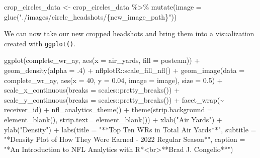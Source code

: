 \documentclass[
  letterpaper,
]{krantz}
\newenvironment{Shaded}{\begin{snugshade}}{\end{snugshade}}
\newcommand{\AttributeTok}[1]{\textcolor[rgb]{0.40,0.45,0.13}{#1}}
\newcommand{\DecValTok}[1]{\textcolor[rgb]{0.68,0.00,0.00}{#1}}
\newcommand{\FloatTok}[1]{\textcolor[rgb]{0.68,0.00,0.00}{#1}}
\newcommand{\FunctionTok}[1]{\textcolor[rgb]{0.28,0.35,0.67}{#1}}
\newcommand{\NormalTok}[1]{\textcolor[rgb]{0.00,0.23,0.31}{#1}}
\newcommand{\OtherTok}[1]{\textcolor[rgb]{0.00,0.23,0.31}{#1}}
\newcommand{\SpecialCharTok}[1]{\textcolor[rgb]{0.37,0.37,0.37}{#1}}
\newcommand{\StringTok}[1]{\textcolor[rgb]{0.13,0.47,0.30}{#1}}
\begin{document}
\begin{Shaded}
\begin{Highlighting}[]
\NormalTok{crop\_circles\_data }\OtherTok{\textless{}{-}}\NormalTok{ crop\_circles\_data }\SpecialCharTok{\%\textgreater{}\%}
  \FunctionTok{mutate}\NormalTok{(}\AttributeTok{image =} \FunctionTok{glue}\NormalTok{(}\StringTok{"./images/circle\_headshots/\{new\_image\_path\}"}\NormalTok{))}
\end{Highlighting}
\end{Shaded}

We can now take our new cropped headshots and bring them into a
visualization created with \texttt{ggplot()}.

\begin{Shaded}
\begin{Highlighting}[]
\FunctionTok{ggplot}\NormalTok{(complete\_wr\_ay, }\FunctionTok{aes}\NormalTok{(}\AttributeTok{x =}\NormalTok{ air\_yards, }\AttributeTok{fill =}\NormalTok{ posteam)) }\SpecialCharTok{+}
  \FunctionTok{geom\_density}\NormalTok{(}\AttributeTok{alpha =}\NormalTok{ .}\DecValTok{4}\NormalTok{) }\SpecialCharTok{+}
\NormalTok{  nflplotR}\SpecialCharTok{::}\FunctionTok{scale\_fill\_nfl}\NormalTok{() }\SpecialCharTok{+}
  \FunctionTok{geom\_image}\NormalTok{(}\AttributeTok{data =}\NormalTok{ complete\_wr\_ay, }\FunctionTok{aes}\NormalTok{(}\AttributeTok{x =} \DecValTok{40}\NormalTok{, }\AttributeTok{y =} \FloatTok{0.04}\NormalTok{,}
                                        \AttributeTok{image =}\NormalTok{ image),}
             \AttributeTok{size =} \FloatTok{0.5}\NormalTok{) }\SpecialCharTok{+}
  \FunctionTok{scale\_x\_continuous}\NormalTok{(}\AttributeTok{breaks =}\NormalTok{ scales}\SpecialCharTok{::}\FunctionTok{pretty\_breaks}\NormalTok{()) }\SpecialCharTok{+}
  \FunctionTok{scale\_y\_continuous}\NormalTok{(}\AttributeTok{breaks =}\NormalTok{ scales}\SpecialCharTok{::}\FunctionTok{pretty\_breaks}\NormalTok{()) }\SpecialCharTok{+}
  \FunctionTok{facet\_wrap}\NormalTok{(}\SpecialCharTok{\textasciitilde{}}\NormalTok{ receiver\_id) }\SpecialCharTok{+}
  \FunctionTok{nfl\_analytics\_theme}\NormalTok{() }\SpecialCharTok{+}
  \FunctionTok{theme}\NormalTok{(}\AttributeTok{strip.background =} \FunctionTok{element\_blank}\NormalTok{(),}
        \AttributeTok{strip.text=} \FunctionTok{element\_blank}\NormalTok{()) }\SpecialCharTok{+}
  \FunctionTok{xlab}\NormalTok{(}\StringTok{"Air Yards"}\NormalTok{) }\SpecialCharTok{+}
  \FunctionTok{ylab}\NormalTok{(}\StringTok{"Density"}\NormalTok{) }\SpecialCharTok{+}
  \FunctionTok{labs}\NormalTok{(}\AttributeTok{title =} \StringTok{"**Top Ten WRs in Total Air Yards**"}\NormalTok{,}
       \AttributeTok{subtitle =} \StringTok{"*Density Plot of How They Were Earned {-} 2022 Regular Season*"}\NormalTok{,}
       \AttributeTok{caption =} \StringTok{"*An Introduction to NFL Analytics with R*\textless{}br\textgreater{}**Brad J. Congelio**"}\NormalTok{)}
\end{Highlighting}
\end{Shaded}
\end{document}
